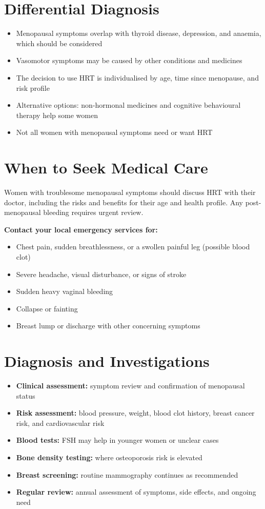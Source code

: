 \section*{Differential Diagnosis}
\begin{itemize}
    \item Menopausal symptoms overlap with thyroid disease, depression, and anaemia, which should be considered
    \item Vasomotor symptoms may be caused by other conditions and medicines
    \item The decision to use HRT is individualised by age, time since menopause, and risk profile
    \item Alternative options: non-hormonal medicines and cognitive behavioural therapy help some women
    \item Not all women with menopausal symptoms need or want HRT
\end{itemize}

\section*{When to Seek Medical Care}
Women with troublesome menopausal symptoms should discuss HRT with their doctor, including the risks and benefits for their age and health profile. Any post-menopausal bleeding requires urgent review.

\textbf{Contact your local emergency services for:}
\begin{itemize}
    \item Chest pain, sudden breathlessness, or a swollen painful leg (possible blood clot)
    \item Severe headache, visual disturbance, or signs of stroke
    \item Sudden heavy vaginal bleeding
    \item Collapse or fainting
    \item Breast lump or discharge with other concerning symptoms
\end{itemize}

\section*{Diagnosis and Investigations}
\begin{itemize}
    \item \textbf{Clinical assessment:} symptom review and confirmation of menopausal status
    \item \textbf{Risk assessment:} blood pressure, weight, blood clot history, breast cancer risk, and cardiovascular risk
    \item \textbf{Blood tests:} FSH may help in younger women or unclear cases
    \item \textbf{Bone density testing:} where osteoporosis risk is elevated
    \item \textbf{Breast screening:} routine mammography continues as recommended
    \item \textbf{Regular review:} annual assessment of symptoms, side effects, and ongoing need
\end{itemize}

